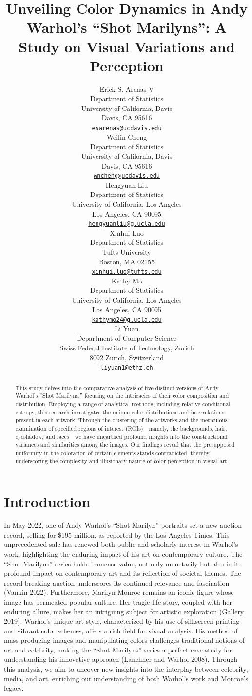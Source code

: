 \documentclass{article}
\title{Unveiling Color Dynamics in Andy Warhol's ``Shot Marilyns'': A
Study on Visual Variations and Perception}
\author{
    Erick S. Arenas V
   \\
    Department of Statistics \\
    University of California, Davis \\
  Davis, CA 95616 \\
  \texttt{\href{mailto:esarenas@ucdavis.edu}{\nolinkurl{esarenas@ucdavis.edu}}} \\
   \And
    Weilin Cheng
   \\
    Department of Statistics \\
    University of California, Davis \\
  Davis, CA 95616 \\
  \texttt{\href{mailto:wncheng@ucdavis.edu}{\nolinkurl{wncheng@ucdavis.edu}}} \\
   \And
    Hengyuan Liu
   \\
    Department of Statistics \\
    University of California, Los Angeles \\
  Los Angeles, CA 90095 \\
  \texttt{\href{mailto:hengyuanliu@g.ucla.edu}{\nolinkurl{hengyuanliu@g.ucla.edu}}} \\
   \And
    Xinhui Luo
   \\
    Department of Statistics \\
    Tufts University \\
  Boston, MA 02155 \\
  \texttt{\href{mailto:xinhui.luo@tufts.edu}{\nolinkurl{xinhui.luo@tufts.edu}}} \\
   \And
    Kathy Mo
   \\
    Department of Statistics \\
    University of California, Los Angeles \\
  Los Angeles, CA 90095 \\
  \texttt{\href{mailto:kathymo24@g.ucla.edu}{\nolinkurl{kathymo24@g.ucla.edu}}} \\
   \And
    Li Yuan
   \\
    Department of Computer Science \\
    Swiss Federal Institute of Technology, Zurich \\
  8092 Zurich, Switzerland \\
  \texttt{\href{mailto:liyuan1@ethz.ch}{\nolinkurl{liyuan1@ethz.ch}}} \\
  }
\begin{document}
\maketitle


\begin{abstract}
This study delves into the comparative analysis of five distinct
versions of Andy Warhol's ``Shot Marilyns,'' focusing on the intricacies
of their color composition and distribution. Employing a range of
analytical methods, including relative conditional entropy, this
research investigates the unique color distributions and interrelations
present in each artwork. Through the clustering of the artworks and the
meticulous examination of specified regions of interest (ROIs)---namely,
the backgrounds, hair, eyeshadow, and faces---we have unearthed profound
insights into the constructional variances and similarities among the
images. Our findings reveal that the presupposed uniformity in the
coloration of certain elements stands contradicted, thereby underscoring
the complexity and illusionary nature of color perception in visual art.
\end{abstract}


\hypertarget{introduction}{%
\section{Introduction}\label{introduction}}

In May 2022, one of Andy Warhol's ``Shot Marilyn'' portraits set a new
auction record, selling for \$195 million, as reported by the Los
Angeles Times. This unprecedented sale has renewed both public and
scholarly interest in Warhol's work, highlighting the enduring impact of
his art on contemporary culture. The ``Shot Marilyns'' series holds
immense value, not only monetarily but also in its profound impact on
contemporary art and its reflection of societal themes. The
record-breaking auction underscores its continued relevance and
fascination (Vankin 2022). Furthermore, Marilyn Monroe remains an iconic
figure whose image has permeated popular culture. Her tragic life story,
coupled with her enduring allure, makes her an intriguing subject for
artistic exploration (Gallery 2019). Warhol's unique art style,
characterized by his use of silkscreen printing and vibrant color
schemes, offers a rich field for visual analysis. His method of
mass-producing images and manipulating colors challenges traditional
notions of art and celebrity, making the ``Shot Marilyns'' series a
perfect case study for understanding his innovative approach (Lanchner
and Warhol 2008). Through this analysis, we aim to uncover new insights
into the interplay between celebrity, media, and art, enriching our
understanding of both Warhol's work and Monroe's legacy.
\end{document}
